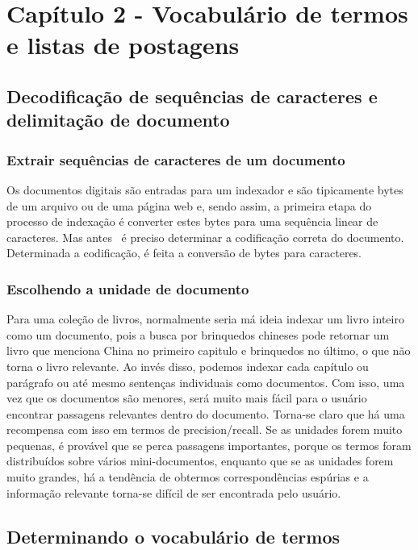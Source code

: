 \section{Capítulo 2 - Vocabulário de termos e listas de postagens}
\label{sec:lista_postagens}

\subsection{Decodificação de sequências de caracteres e delimitação de documento}

\subsubsection{Extrair sequências de caracteres de um documento}

Os documentos digitais são entradas para um indexador e são tipicamente bytes de um arquivo ou de uma página web e, sendo assim, a primeira etapa do processo de indexação é converter estes bytes para uma sequência linear de caracteres. Mas antes  é preciso determinar a codificação correta do documento. Determinada a codificação, é feita a conversão de bytes para caracteres. 

\subsubsection{Escolhendo a unidade de documento}

Para uma coleção de livros, normalmente seria má ideia indexar um livro inteiro como um documento, pois a busca por brinquedos chineses pode retornar um livro que menciona China no primeiro capitulo e brinquedos no último, o que não torna o livro relevante. Ao invés disso, podemos indexar cada capítulo ou parágrafo ou até mesmo sentenças individuais como documentos. Com isso, uma vez que os documentos são menores, será muito mais fácil para o usuário encontrar passagens relevantes dentro do documento. Torna-se claro que há uma recompensa com isso em termos de precision/recall. Se as unidades forem muito pequenas, é provável que se perca passagens importantes, porque os termos foram distribuídos sobre vários mini-documentos, enquanto que se as unidades forem muito grandes, há a tendência de obtermos correspondências espúrias e a informação relevante torna-se difícil de ser encontrada pelo usuário.

\subsection{Determinando o vocabulário de termos}

